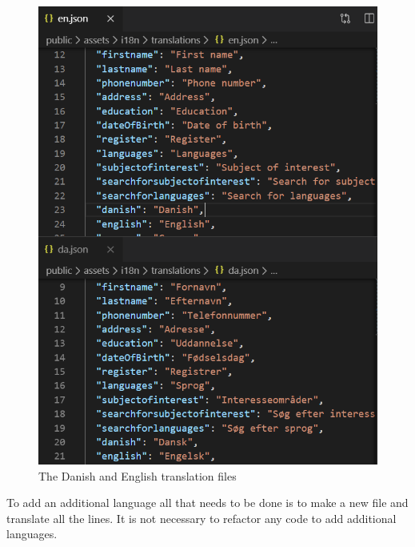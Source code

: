\begin{figure}
    \centering
    \includegraphics[scale=0.5]{figures/translations.PNG}
    \caption{The Danish and English translation files}
    \label{fig:translationfiles}
\end{figure}
\noindent
To add an additional language all that needs to be done is to make a new file and translate all the lines. 
It is not necessary to refactor any code to add additional languages.